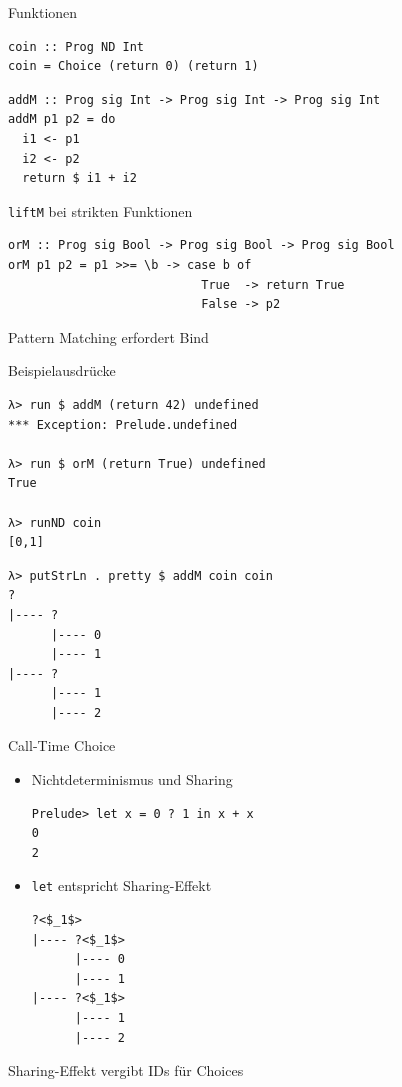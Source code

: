 \documentclass{beamer}
\newcommand{\haskellinline}[1]{\texttt{#1}}
\begin{document}
\begin{frame}[fragile]{Funktionen}
\begin{verbatim}
coin :: Prog ND Int
coin = Choice (return 0) (return 1)
\end{verbatim}
\pause
\begin{verbatim}
addM :: Prog sig Int -> Prog sig Int -> Prog sig Int
addM p1 p2 = do
  i1 <- p1
  i2 <- p2
  return $ i1 + i2
\end{verbatim}
\MVRightArrow{} \haskellinline{liftM} bei strikten Funktionen
\pause
\begin{verbatim}
orM :: Prog sig Bool -> Prog sig Bool -> Prog sig Bool
orM p1 p2 = p1 >>= \b -> case b of
                           True  -> return True
                           False -> p2
\end{verbatim}
\MVRightArrow{} Pattern Matching erfordert Bind
\end{frame}

\begin{frame}[fragile]{Beispielausdrücke}
\begin{verbatim}
λ> run $ addM (return 42) undefined
*** Exception: Prelude.undefined

λ> run $ orM (return True) undefined
True

λ> runND coin
[0,1]
\end{verbatim}
\pause
\begin{verbatim}
λ> putStrLn . pretty $ addM coin coin
?
|---- ?
      |---- 0
      |---- 1
|---- ?
      |---- 1
      |---- 2
\end{verbatim}
\end{frame}

\begin{frame}[fragile]{Call-Time Choice}
\begin{itemize}
\item Nichtdeterminismus und \alert{Sharing}
\begin{verbatim}
Prelude> let x = 0 ? 1 in x + x
0
2
\end{verbatim}
\item \haskellinline{let} entspricht Sharing-Effekt
\begin{verbatim}
?<$_1$>
|---- ?<$_1$>
      |---- 0
      |---- 1
|---- ?<$_1$>
      |---- 1
      |---- 2
\end{verbatim}
\end{itemize}
\MVRightArrow{} Sharing-Effekt vergibt \alert{IDs} für Choices
\end{frame}
\end{document}
